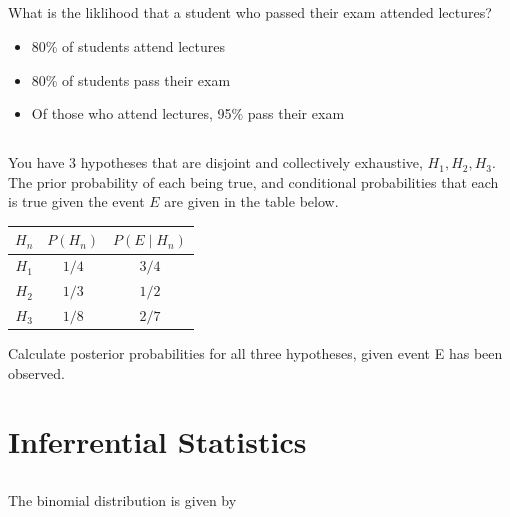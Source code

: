 \documentclass[twocolumn]{article}
\begin{document}
\subsection{}

    What is the liklihood that a student who passed their exam attended lectures?

    \begin{itemize}
        \item 80\% of students attend lectures
        \item 80\% of students pass their exam
        \item Of those who attend lectures, 95\% pass their exam
    \end{itemize}
    
\subsection{}

    You have 3 hypotheses that are disjoint and collectively exhaustive, $H_1, H_2, H_3$. The prior probability of each being true, and conditional probabilities that each is true given the event $E$ are given in the table below.

    \begin{table}[h!]
        \centering
        \begin{tabular}{c | c | c }
            \toprule
            $H_n$ & $P(H_n)$ & $P(E \mid H_n)$ \\
            \midrule
            $H_1$ & ${1}/{4}$ & ${3}/{4}$  \\
            $H_2$ & ${1}/{3}$ & ${1}/{2}$  \\
            $H_3$ & ${1}/{8}$ & ${2}/{7}$ \\
            \bottomrule
        \end{tabular}
    \end{table}

    Calculate posterior probabilities for all three hypotheses, given event E has been observed.


\clearpage
\section{Inferrential Statistics}

\subsection{}

The binomial distribution is given by 
\end{document}
